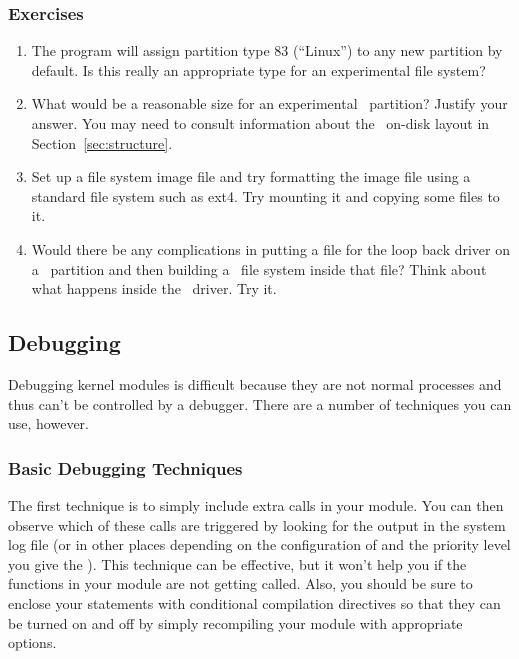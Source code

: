 \subsubsection*{Exercises}

\begin{enumerate}

\item The  program will assign partition type 83 (``Linux'') to any new partition
  by default. Is this really an appropriate type for an experimental file system?

\item What would be a reasonable size for an experimental \GenericFS\ partition? Justify your
  answer. You may need to consult information about the \GenericFS\ on-disk layout in
  Section~\ref{sec:structure}.

\item Set up a file system image file and try formatting the image file using a standard file
  system such as ext4. Try mounting it and copying some files to it.

\item Would there be any complications in putting a file for the loop back driver on a
  \GenericFS\ partition and then building a \GenericFS\ file system inside that file? Think
  about what happens inside the \GenericFS\ driver. Try it.

\end{enumerate}

\subsection{Debugging \GenericFS}
\label{sec:debugging}

Debugging kernel modules is difficult because they are not normal processes and thus can't be
controlled by a debugger. There are a number of techniques you can use, however.

\subsubsection{Basic Debugging Techniques}

The first technique is to simply include extra  calls in your module. You can then
observe which of these calls are triggered by looking for the output in the system log file (or
in other places depending on the configuration of  and the priority level you
give the ). This technique can be effective, but it won't help you if the functions
in your module are not getting called. Also, you should be sure to enclose your 
statements with conditional compilation directives so that they can be turned on and off by
simply recompiling your module with appropriate options.

